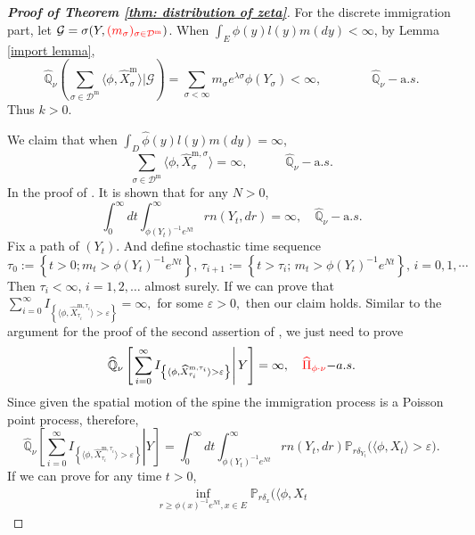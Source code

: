 \documentclass[12pt,a4paper]{amsart}
\theoremstyle{plain}
\theoremstyle{definition}
\numberwithin{equation}{section}
\begin{document}
\begin{proof}[{\bf Proof of Theorem \ref{thm: distribution of zeta}}]
	For the discrete immigration part, let $\mathcal G=\sigma(Y, {\color{red}( m_\sigma)_{\sigma\in\mathcal D^{\mathrm m}}})$.  When  $\int_E\hat{\phi}(y)l(y)m(dy)<\infty$, by Lemma \ref{import lemma},
\[
	\widehat{\mathbb Q}_{\nu}\left(\sum_{\sigma\in \mathcal D^{\mathrm m}}\langle \phi, \widehat X_{\sigma}^{{\mathrm m}}\rangle\Big|\mathcal G \right)
	=\sum_{\sigma<\infty}m_\sigma e^{\lambda \sigma}\phi(Y_{\sigma})<\infty,  \qquad\qquad \widehat{\mathbb Q}_{\nu}-{\mathrm a.s.}
\]
	Thus $k>0$.

	We claim that when $\int_D\hat\phi(y)l(y)m(dy)=\infty$,
\begin{equation}\label{infty}
	\sum_{\sigma\in \mathcal D^{\mathrm m}}\langle \phi, \widehat X_{\sigma}^{{\mathrm m},\sigma}\rangle =\infty,\quad\qquad  \widehat{\mathbb Q}_\nu-{\mathrm a.s.}
\end{equation}
	In the proof of \cite[Lemma $3.2$]{LiuRenSong2009Llog}.  It is shown that for any $N>0$,
\begin{equation}\label{inf}
	\int_0^\infty dt\int_{\phi(Y_t)^{-1}e^{Nt}}^\infty rn(Y_t,dr)
	=\infty,\quad \widehat{\mathbb Q}_\nu-{\mathrm a.s.}
\end{equation}
	Fix a path of $(Y_t)$.  And define stochastic
	time sequence
\[
	\tau_0:=\left\{t>0; m_t>\phi(Y_t)^{-1}e^{Nt}\right\},\,
	\tau_{i+1}:=\left\{t>\tau_i;\, m_t>\phi(Y_t)^{-1}e^{Nt}\right\},\, i=0,1,\cdots
\]
	Then $\tau_i<\infty$, $i=1,2,\ldots$ almost surely.
	If we can prove that $\sum_{i=0}^\infty I_{\left\{\langle\phi, \widehat X^{{\mathrm m},\tau_i}_{\tau_i}\rangle  >\varepsilon\right\}}=\infty,$ for some $\varepsilon>0,$ then our claim holds.  Similar to the argument for the proof of the second assertion of \cite[Lemma $2.2$]{LiuRenSong2009Llog}, we just need to prove
\[
	\widehat{\mathbb Q}_\nu
	\left[\left.\sum_{i=0}^\infty I_{\left\{\langle\phi, \widehat X^{{\mathrm m},\tau_i}_{\tau_i}\rangle  >\varepsilon\right\}} \right| Y\right]=\infty,\quad {\color{red}\widehat\Pi_{\phi\cdot\nu}}{\mathrm -a.s.}
\]
	Since given the spatial motion of the spine the immigration process is a Poisson point process, therefore,
\[
	\widehat{\mathbb Q}_\nu\left[\left.\sum_{i=0}^\infty I_{\left\{\langle\phi, \widehat X^{{\mathrm m},\tau_i}_{\tau_i}\rangle  >\varepsilon\right\}}\right| Y\right]=\int_0^\infty dt\int_{\phi(Y_t)^{-1}e^{Nt}}^\infty rn(Y_t, dr)\mathbb{P}_{r\delta_{Y_t}}\big(\langle\phi, X_t \rangle >\varepsilon\big).
\]
	If we can prove for any time $t>0$,
\begin{eqnarray}\label{last point}
	\inf_{r\geq \phi(x)^{-1}e^{Nt}, x\in E}\mathbb P_{r\delta_x}\big(\langle\phi, X_t

\end{eqnarray}
\end{proof}
\end{document}

